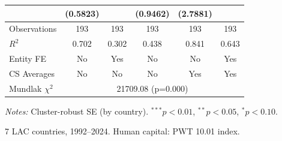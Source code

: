 \begin{table}[htbp]
\begin{tabular}{lccccc}
 & (0.5823) &  & (0.9462) & (2.7881) &  \\[2pt]
\midrule
Observations & 193 & 193 & 193 & 193 & 193 \\
$R^2$ & 0.702 & 0.302 & 0.438 & 0.841 & 0.643 \\
Entity FE & No & Yes & No & No & Yes \\
CS Averages & No & No & No & Yes & Yes \\
\midrule
Mundlak $\chi^2$ & \multicolumn{5}{c}{21709.08 (p=0.000)} \\
\bottomrule
\end{tabular}
\begin{tablenotes}
\footnotesize
\item \textit{Notes:} Cluster-robust SE (by country). $^{***}p<0.01$, $^{**}p<0.05$, $^{*}p<0.10$.
\item 7 LAC countries, 1992--2024. Human capital: PWT 10.01 index.
\end{tablenotes}
\end{table}